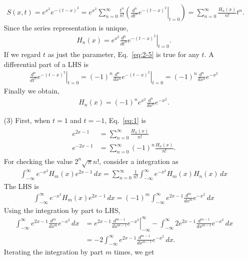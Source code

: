 \documentclass[floatfix,nofootinbib,superscriptaddress,fleqn]{revtex4-2}
\begin{document}
\begin{itemize}
\begin{align}
  S(x,t) = e^{x^2}e^{-(t-x)^2} = \left.e^{x^2}\sum^\infty_{n=0}\frac{t^n}{n!}
  \left(\frac{d^n}{dt^n}e^{-(t-x)^2}\right|_{t=0} \right)
  = \sum^\infty_{n=0}\frac{H_n(x)}{n!}t^n.
\end{align}
Since the series representation is unique,
\begin{align}\label{eq:2-5}
  H_n(x)=e^{x^2}\left.\frac{d^n}{dt^n}e^{-(t-x)^2}\right|_{t=0}.
\end{align}
If we regard $t$ as just the parameter, Eq.~\eqref{eq:2-5} is true for 
any $t$. 
A differential part of a LHS is
\begin{align}
  \left.\frac{d^n}{dt^n}e^{-(t-x)^2}\right|_{t=0}
  =\left.(-1)^n\frac{d^n}{dx^n}e^{-(t-x)^2}\right|_{t=0}
  =(-1)^n\frac{d^n}{dx^n}e^{-x^2}
\end{align}
Finally we obtain,
\begin{align}\label{eq:2-5-1}
  H_n(x) = (-1)^ne^{x^2}\frac{d^n}{dx^n}e^{-x^2}.
\end{align}
\item[(3)]First, when $t=1$ and $t=-1$, Eq.~\eqref{eq:1} is
\begin{align}
  \begin{split}
    e^{2x-1}&=\sum^\infty_{n=0}\frac{H_n(x)}{n!} \\
    e^{-2x-1}&=\sum^\infty_{n=0}(-1)^n\frac{H_n(x)}{n!}.
  \end{split}
\end{align} 
For checking the value $2^n \sqrt{\pi}n!$, consider a integration as
\begin{align}\label{eq:2-6}
  \int_{-\infty}^{\infty}e^{-x^2}H_m(x)e^{2x-1}\,dx
  =\sum_{n=0}^\infty\frac{1}{n!}\int_{-\infty}^{\infty}
  e^{-x^2}H_m(x)H_n(x)\,dx
\end{align}
The LHS is
\begin{align}
  \int_{-\infty}^{\infty}e^{-x^2}H_m(x)e^{2x-1}\,dx 
  =(-1)^m\int_{-\infty}^{\infty}e^{2x-1}
  \frac{d^m}{dx^m}e^{-x^2}\,dx
\end{align}
Using the integration by part to LHS,
\begin{align}
    \int_{-\infty}^{\infty}e^{2x-1}\frac{d^m}{dx^m}e^{-x^2}\,dx  
    &=\left.e^{2x-1}
    \frac{d^{m-1}}{dx^{m-1}}e^{-x^2}\right|^\infty_{-\infty}
    -\int_{-\infty}^{\infty}2e^{2x-1}
    \frac{d^{m-1}}{dx^{m-1}}e^{-x^2}\,dx \\
    &=-2\int_{-\infty}^{\infty}e^{2x-1}
    \frac{d^{m-1}}{dx^{m-1}}e^{-x^2}\,dx. 
\end{align}
Iterating the integration by part $m$ times, we get 

\end{itemize}
\end{document}
